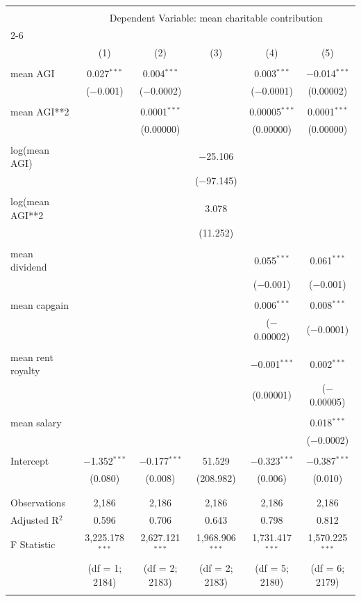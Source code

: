 \documentclass{article}
\begin{document}
\begingroup 
\tiny 
\begin{tabular}{@{\extracolsep{.001pt}}lccccc} 
\\[-1.8ex]\hline 
\hline \\[-1.8ex] 
 & \multicolumn{5}{c}{Dependent Variable: mean charitable contribution} \\ 
\cline{2-6} 
\\[-1.8ex] & (1) & (2) & (3) & (4) & (5)\\ 
\hline \\[-1.8ex] 
 mean AGI & 0.027$^{***}$ & 0.004$^{***}$ &  & 0.003$^{***}$ & $-$0.014$^{***}$ \\ 
  & ($-$0.001) & ($-$0.0002) &  & ($-$0.0001) & (0.00002) \\ 
  & & & & & \\ 
 mean AGI**2 &  & 0.0001$^{***}$ &  & 0.00005$^{***}$ & 0.0001$^{***}$ \\ 
  &  & (0.00000) &  & (0.00000) & (0.00000) \\ 
  & & & & & \\ 
 log(mean AGI) &  &  & $-$25.106 &  &  \\ 
  &  &  & ($-$97.145) &  &  \\ 
  & & & & & \\ 
 log(mean AGI**2 &  &  & 3.078 &  &  \\ 
  &  &  & (11.252) &  &  \\ 
  & & & & & \\ 
 mean dividend &  &  &  & 0.055$^{***}$ & 0.061$^{***}$ \\ 
  &  &  &  & ($-$0.001) & ($-$0.001) \\ 
  & & & & & \\ 
 mean capgain &  &  &  & 0.006$^{***}$ & 0.008$^{***}$ \\ 
  &  &  &  & ($-$0.00002) & ($-$0.0001) \\ 
  & & & & & \\ 
 mean rent royalty &  &  &  & $-$0.001$^{***}$ & 0.002$^{***}$ \\ 
  &  &  &  & (0.00001) & ($-$0.00005) \\ 
  & & & & & \\ 
 mean salary &  &  &  &  & 0.018$^{***}$ \\ 
  &  &  &  &  & ($-$0.0002) \\ 
  & & & & & \\ 
 Intercept & $-$1.352$^{***}$ & $-$0.177$^{***}$ & 51.529 & $-$0.323$^{***}$ & $-$0.387$^{***}$ \\ 
  & (0.080) & (0.008) & (208.982) & (0.006) & (0.010) \\ 
  & & & & & \\ 
\hline \\[-1.8ex] 
Observations & 2,186 & 2,186 & 2,186 & 2,186 & 2,186 \\ 
Adjusted R$^{2}$ & 0.596 & 0.706 & 0.643 & 0.798 & 0.812 \\ 
F Statistic & 3,225.178$^{***}$  & 2,627.121$^{***}$  & 1,968.906$^{***}$  & 1,731.417$^{***}$  & 1,570.225$^{***}$  \\ 
 & (df = 1; 2184) & (df = 2; 2183) & (df = 2; 2183) & (df = 5; 2180) & (df = 6; 2179) \\
\hline 
\hline \\[-1.8ex] 
\end{tabular} 
\end{document}
